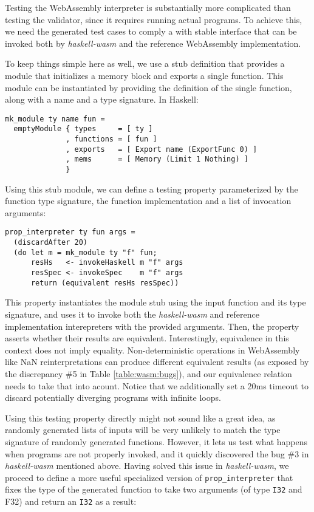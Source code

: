 \documentclass[acmsmall, anonymous]{acmart}
\begin{document}
Testing the WebAssembly interpreter is substantially more complicated than
testing the validator, since it requires running actual programs.
%
To achieve this, we need the generated test cases to comply a with stable
interface that can be invoked both by \textit{haskell-wasm} and the reference
WebAssembly implementation.


To keep things simple here as well, we use a stub definition that provides a
module that initializes a memory block and exports a single function.
%
This module can be instantiated by providing the definition of the single
function, along with a name and a type signature.
%
In Haskell:

\begin{verbatim}
mk_module ty name fun =
  emptyModule { types     = [ ty ]
              , functions = [ fun ]
              , exports   = [ Export name (ExportFunc 0) ]
              , mems      = [ Memory (Limit 1 Nothing) ]
              }
\end{verbatim}

Using this stub module, we can define a testing property parameterized by the
function type signature, the function implementation and a list of invocation
arguments:

\begin{verbatim}
prop_interpreter ty fun args =
  (discardAfter 20)
  (do let m = mk_module ty "f" fun;
      resHs   <- invokeHaskell m "f" args
      resSpec <- invokeSpec    m "f" args
      return (equivalent resHs resSpec))
\end{verbatim}

This property instantiates the module stub using the input function and its type
signature, and uses it to invoke both the \textit{haskell-wasm} and reference
implementation interepreters with the provided arguments.
%
Then, the property asserts whether their results are equivalent.
%
Interestingly, equivalence in this context does not imply equality.
%
Non-deterministic operations in WebAssembly like NaN reinterpretations can
produce different equivalent results (as exposed by the discrepancy \#5 in Table
\ref{table:wasm:bugs}), and our equivalence relation needs to take that into
acount.
%
Notice that we additionally set a 20ms timeout to discard potentially diverging
programs with infinite loops.


Using this testing property directly might not sound like a great idea, as
randomly generated lists of inputs will be very unlikely to match the type
signature of randomly generated functions.
%
However, it lets us test what happens when programs are not properly invoked,
and it quickly discovered the bug \#3 in \textit{haskell-wasm} mentioned above.
%
Having solved this issue in \textit{haskell-wasm}, we proceed to define a more
useful specialized version of \texttt{prop\_interpreter} that fixes the type of
the generated function to take two arguments (of type \texttt{I32} and {F32})
and return an \texttt{I32} as a result:
\end{document}
